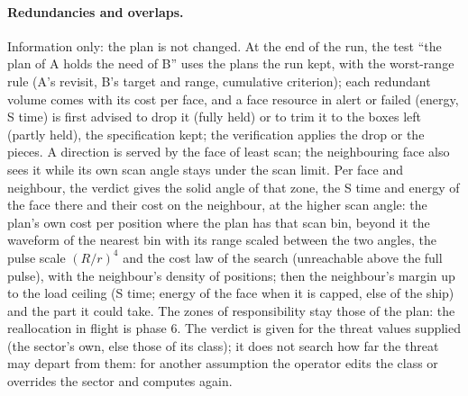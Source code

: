 \documentclass[11pt,a4paper]{article}
\begin{document}
\paragraph{Redundancies and overlaps.} Information only: the plan is not changed. At the end of the run, the test ``the
plan of A holds the need of B'' uses the plans the run kept, with the worst-range rule (A's
revisit, B's target and range, cumulative criterion); each redundant volume comes with its cost per face, and a face
resource in alert or failed (energy, S time) is first advised to drop it (fully held) or to trim it to the boxes left
(partly held), the specification kept; the verification applies the drop or the pieces. A direction is served by the
face of least scan; the neighbouring face also sees it while its own scan angle stays under the scan limit. Per face
and neighbour, the verdict gives the solid angle of that zone, the S time and energy of the face there and their cost on
the neighbour, at the higher scan angle: the plan's own cost per position where the plan has that scan bin, beyond it
the waveform of the nearest bin with its range scaled between the two angles, the pulse scale $(R/r)^4$ and the cost
law of the search (unreachable above the full pulse), with the neighbour's density of positions; then the neighbour's
margin up to the load ceiling (S time; energy of the face when it is capped, else of the ship) and the part it could
take. The zones of responsibility stay those of the plan: the reallocation in flight is phase 6. The verdict is given for the
threat values supplied (the sector's own, else those of its class); it does not search how far the threat may depart
from them: for another assumption the operator edits the class or overrides the sector and computes again.

\end{document}
